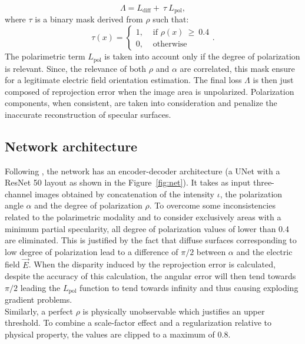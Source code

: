 \begin{equation}
\Lambda =  L_{\textrm{diff}} + ~\tau ~L_{\textrm{pol}},
\end{equation}
\noindent
where $\tau$ is a binary mask derived from $\rho$ such that:
\begin{equation}
\tau(x) = \begin{cases} 1, & \mbox{ if } \rho(x) ~ \geq ~ 0.4\\
0, & \mbox{ otherwise}\end{cases}.
\end{equation}
The polarimetric term $L_{\textrm{pol}}$ is taken into account only if the degree of polarization is relevant. Since, the relevance of both $\rho$ and $\alpha$ are correlated, this mask ensure for a legitimate electric field orientation estimation.
The final loss $\Lambda$ is then just composed of reprojection error when the image area is unpolarized. Polarization components, when consistent, are taken into consideration and penalize the inaccurate reconstruction of specular surfaces.

\subsection{Network architecture}

Following \cite{godard2019digging}, the network has an encoder-decoder architecture (a UNet with a ResNet 50 layout as shown in the Figure~\ref{fig:net}). It takes as input three-channel images obtained by concatenation of the intensity $\iota$, the polarization angle $\alpha$ and the degree of polarization $\rho$.
To overcome some inconsistencies related to the polarimetric modality and to consider exclusively areas with a minimum partial specularity, all degree of polarization values of lower than
0.4 are eliminated. This is justified by the fact that diffuse surfaces corresponding to low degree of polarization lead to a difference of $\pi/2$ between $\alpha$ and the electric field $\vec{E}$.
When the disparity induced by the reprojection error is calculated, despite the accuracy of this calculation, the angular error will then tend towards $\pi/2$ leading the $L_{\textrm{pol}}$ function to tend towards infinity and thus causing exploding gradient problems.\\
Similarly, a perfect $\rho$ is physically unobservable which justifies an upper threshold. To combine a scale-factor effect and a regularization relative to physical property, the values are clipped to a maximum of 0.8.

